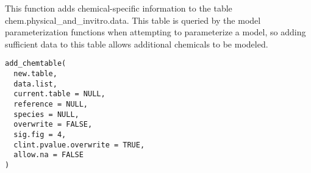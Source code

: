 \documentclass[a4paper]{book}
\begin{document}
%
\begin{Description}\relax
This function adds chemical-specific information to the table
chem.physical\_and\_invitro.data. This table is queried by the model
parameterization functions when attempting to parameterize a model, so
adding sufficient data to this table allows additional chemicals to be
modeled.
\end{Description}
%
\begin{Usage}
\begin{verbatim}
add_chemtable(
  new.table,
  data.list,
  current.table = NULL,
  reference = NULL,
  species = NULL,
  overwrite = FALSE,
  sig.fig = 4,
  clint.pvalue.overwrite = TRUE,
  allow.na = FALSE
)
\end{verbatim}
\end{Usage}
%
\end{document}
